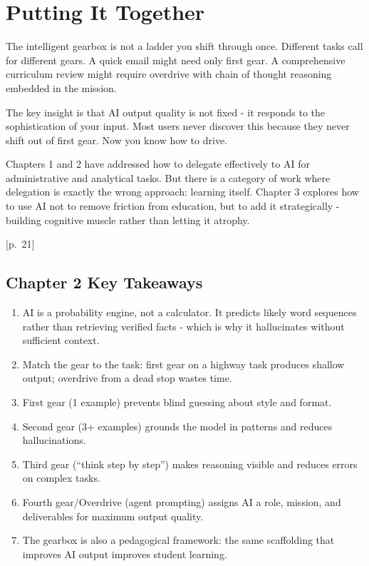 \documentclass[
  letterpaper,
  DIV=11,
  numbers=noendperiod]{scrreprt}
\providecommand{\tightlist}{%
  \setlength{\itemsep}{0pt}\setlength{\parskip}{0pt}}
\begin{document}
\section{Putting It Together}\label{putting-it-together}

The intelligent gearbox is not a ladder you shift through once.
Different tasks call for different gears. A quick email might need only
first gear. A comprehensive curriculum review might require overdrive
with chain of thought reasoning embedded in the mission.

The key insight is that AI output quality is not fixed - it responds to
the sophistication of your input. Most users never discover this because
they never shift out of first gear. Now you know how to drive.

Chapters 1 and 2 have addressed how to delegate effectively to AI for
administrative and analytical tasks. But there is a category of work
where delegation is exactly the wrong approach: learning itself. Chapter
3 explores how to use AI not to remove friction from education, but to
add it strategically - building cognitive muscle rather than letting it
atrophy.

{[}p.~21{]}

\subsection{Chapter 2 Key Takeaways}\label{chapter-2-key-takeaways}

\begin{enumerate}
\def\labelenumi{\arabic{enumi}.}
\tightlist
\item
  AI is a probability engine, not a calculator. It predicts likely word
  sequences rather than retrieving verified facts - which is why it
  hallucinates without sufficient context.
\item
  Match the gear to the task: first gear on a highway task produces
  shallow output; overdrive from a dead stop wastes time.
\item
  First gear (1 example) prevents blind guessing about style and format.
\item
  Second gear (3+ examples) grounds the model in patterns and reduces
  hallucinations.
\item
  Third gear (``think step by step'') makes reasoning visible and
  reduces errors on complex tasks.
\item
  Fourth gear/Overdrive (agent prompting) assigns AI a role, mission,
  and deliverables for maximum output quality.
\item
  The gearbox is also a pedagogical framework: the same scaffolding that
  improves AI output improves student learning.
\end{enumerate}
\end{document}
